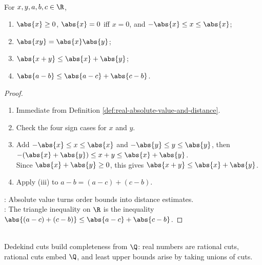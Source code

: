 \begin{proposition} \label{prop:real-absolute-value-triangle-inequality} \\
For $x,y,a,b,c\in\R$,
\begin{enumerate}[label=(\roman*)]
\setlength{\itemsep}{0pt}
\item $\abs{x}\geq0$, $\abs{x}=0$ iff $x=0$, and $-\abs{x}\leq x\leq\abs{x}$;
\item $\abs{xy}=\abs{x}\abs{y}$;
\item $\abs{x+y}\leq\abs{x}+\abs{y}$;
\item $\abs{a-b}\leq\abs{a-c}+\abs{c-b}$.
\end{enumerate}
\begin{proof}
\begin{enumerate}[label=(\roman*)]
\setlength{\itemsep}{0pt}
\item Immediate from Definition \ref{def:real-absolute-value-and-distance}.
\item Check the four sign cases for $x$ and $y$.
\item Add $-\abs{x}\leq x\leq\abs{x}$ and $-\abs{y}\leq y\leq\abs{y}$, then $-(\abs{x}+\abs{y})\leq x+y\leq\abs{x}+\abs{y}$.\\
Since $\abs{x}+\abs{y}\geq0$, this gives $\abs{x+y}\leq\abs{x}+\abs{y}$.
\item Apply (iii) to $a-b=(a-c)+(c-b)$.
\end{enumerate}
: Absolute value turns order bounds into distance estimates.\\
: The triangle inequality on $\R$ is the inequality $\abs{(a-c)+(c-b)}\leq\abs{a-c}+\abs{c-b}$.
\end{proof}
\end{proposition}

\begin{perspective} \label{per:dedekind-construction-as-completeness-proof} \\
Dedekind cuts build completeness from $\Q$: real numbers are rational cuts, rational cuts embed $\Q$, and least upper bounds arise by taking unions of cuts.
\end{perspective}

